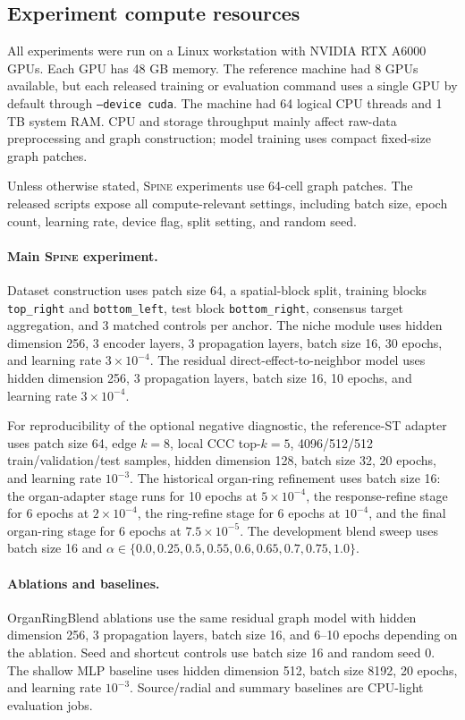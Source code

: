 \documentclass[sigconf,review,balance=false]{acmart}
\newcommand{\methodname}{\textsc{Spine}\xspace}
\begin{document}
\subsection{Experiment compute resources}
\label{app:compute_resources}

All experiments were run on a Linux workstation with NVIDIA RTX A6000 GPUs. Each GPU has 48 GB memory. The reference machine had 8 GPUs available, but each released training or evaluation command uses a single GPU by default through \texttt{--device cuda}. The machine had 64 logical CPU threads and 1 TB system RAM. CPU and storage throughput mainly affect raw-data preprocessing and graph construction; model training uses compact fixed-size graph patches.

Unless otherwise stated, \methodname{} experiments use 64-cell graph patches. The released scripts expose all compute-relevant settings, including batch size, epoch count, learning rate, device flag, split setting, and random seed.

\paragraph{Main \methodname{} experiment.}
Dataset construction uses patch size 64, a spatial-block split, training blocks \texttt{top\_right} and \texttt{bottom\_left}, test block \texttt{bottom\_right}, consensus target aggregation, and 3 matched controls per anchor. The niche module uses hidden dimension 256, 3 encoder layers, 3 propagation layers, batch size 16, 30 epochs, and learning rate $3\times10^{-4}$. The residual direct-effect-to-neighbor model uses hidden dimension 256, 3 propagation layers, batch size 16, 10 epochs, and learning rate $3\times10^{-4}$.

For reproducibility of the optional negative diagnostic, the reference-ST
adapter uses patch size 64, edge $k=8$, local CCC top-$k=5$, 4096/512/512
train/validation/test samples, hidden dimension 128, batch size 32, 20 epochs,
and learning rate $10^{-3}$. The historical organ-ring refinement uses batch
size 16: the organ-adapter stage runs for 10 epochs at $5\times10^{-4}$, the
response-refine stage for 6 epochs at $2\times10^{-4}$, the ring-refine stage
for 6 epochs at $10^{-4}$, and the final organ-ring stage for 6 epochs at
$7.5\times10^{-5}$. The development blend sweep uses batch size 16 and
$\alpha\in\{0.0,0.25,0.5,0.55,0.6,0.65,0.7,0.75,1.0\}$.

\paragraph{Ablations and baselines.}
OrganRingBlend ablations use the same residual graph model with hidden dimension 256, 3 propagation layers, batch size 16, and 6--10 epochs depending on the ablation. Seed and shortcut controls use batch size 16 and random seed 0. The shallow MLP baseline uses hidden dimension 512, batch size 8192, 20 epochs, and learning rate $10^{-3}$. Source/radial and summary baselines are CPU-light evaluation jobs.
\end{document}
